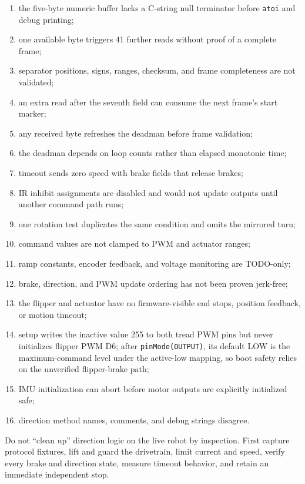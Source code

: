 \documentclass[10pt,openany]{book}
\begin{document}
\begin{enumerate}
  \item the five-byte numeric buffer lacks a C-string null terminator before \texttt{atoi} and debug printing;
  \item one available byte triggers 41 further reads without proof of a complete frame;
  \item separator positions, signs, ranges, checksum, and frame completeness are not validated;
  \item an extra read after the seventh field can consume the next frame's start marker;
  \item any received byte refreshes the deadman before frame validation;
  \item the deadman depends on loop counts rather than elapsed monotonic time;
  \item timeout sends zero speed with brake fields that release brakes;
  \item IR inhibit assignments are disabled and would not update outputs until another command path runs;
  \item one rotation test duplicates the same condition and omits the mirrored turn;
  \item command values are not clamped to PWM and actuator ranges;
  \item ramp constants, encoder feedback, and voltage monitoring are TODO-only;
  \item brake, direction, and PWM update ordering has not been proven jerk-free;
  \item the flipper and actuator have no firmware-visible end stops, position feedback, or motion timeout;
  \item setup writes the inactive value 255 to both tread PWM pins but never initializes flipper PWM D6; after \texttt{pinMode(OUTPUT)}, its default LOW is the maximum-command level under the active-low mapping, so boot safety relies on the unverified flipper-brake path;
  \item IMU initialization can abort before motor outputs are explicitly initialized safe;
  \item direction method names, comments, and debug strings disagree.
\end{enumerate}

\begin{safetybox}
Do not ``clean up'' direction logic on the live robot by inspection. First capture protocol fixtures, lift and guard the drivetrain, limit current and speed, verify every brake and direction state, measure timeout behavior, and retain an immediate independent stop.
\end{safetybox}
\end{document}
